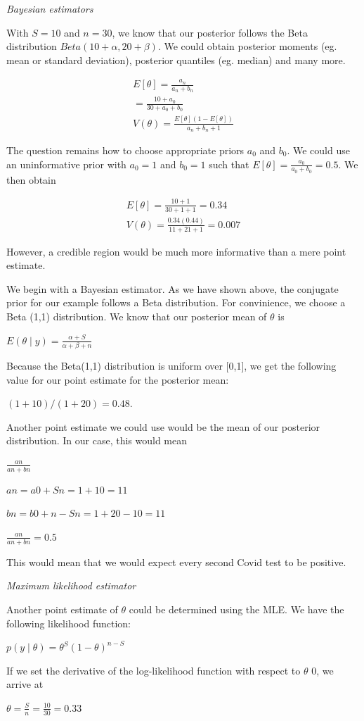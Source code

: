 \documentclass{article}
\begin{document}
\vspace{2em}

\textit{Bayesian estimators}

With $S=10$ and $n=30$, we know that our posterior follows the Beta distribution $Beta(10+\alpha,20+\beta)$. We could obtain posterior moments (eg. mean or standard deviation), posterior quantiles (eg. median) and many more.

\begin{align*}
    E[\theta]= \frac{a_{n}}{a_n+b_n} \\
    = \frac{10+a_0}{30+a_0+b_0} \\
    V(\theta)=\frac{E[\theta](1-E[\theta])}{a_n+b_n+1}
\end{align*}

The question remains how to choose appropriate priors $a_0$ and $b_0$. We could use an uninformative prior with $a_0=1$ and $b_0=1$ such that $E[\theta]=\frac{a_{0}}{a_0+b_0}=0.5$. We then obtain 

\begin{align*}
    E[\theta]= \frac{10+1}{30+1+1}=0.34 \\
    V(\theta)=\frac{0.34(0.44)}{11+21+1}=0.007
\end{align*}

However, a credible region would be much more informative than a mere point estimate. 


We begin with a Bayesian estimator. As we have shown above, the conjugate prior for our example follows a Beta distribution. For convinience, we choose a Beta (1,1) distribution. We know that our posterior mean of $\theta$ is 
\begin{center}
    $E(\theta \mid y) = \frac{\alpha + S}{\alpha + \beta + n}$
\end{center}
Because the Beta(1,1) distribution is uniform over [0,1], we get the following value for our point estimate for the posterior mean:
\begin{center}
    $(1+10)/(1+20)=0.48.$
\end{center}
Another point estimate we could use would be the mean of our posterior distribution. In our case, this would mean 
\begin{center}
$\frac{an}{an+bn}$\par
$an=a0+Sn=1+10=11$ \par
$bn=b0+n-Sn=1+20-10=11$\par
$ \frac{an}{an+bn}=0.5$
\end{center}
This would mean that we would expect every second Covid test to be positive. \par
\newpage
\textit {Maximum likelihood estimator} \par 
Another point estimate of $\theta$ could be determined using the MLE. We have the following likelihood function:
\begin{center}
    $p(y \mid \theta) = \theta^S (1 - \theta)^{n-S}$
\end{center}
If we set the derivative of the log-likelihood function with respect to $\theta$ 0, we arrive at 
\begin{center}
    $\theta=\frac{S}{n}=\frac{10}{30}=0.33$
\end{center}
\vspace{2em}
\end{document}
